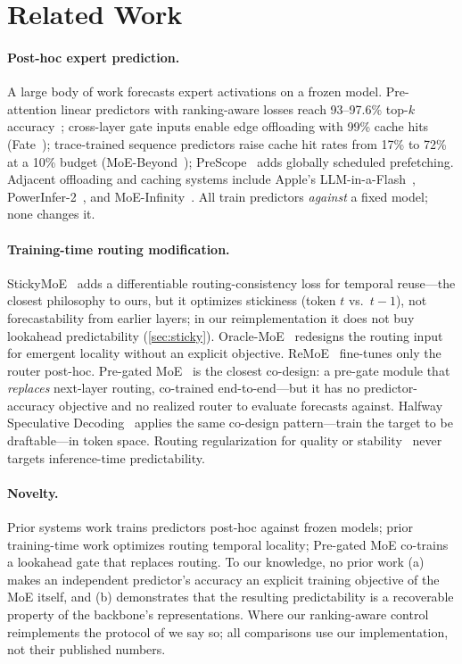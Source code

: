 \documentclass[10pt,letterpaper]{article}
\begin{document}
\section{Related Work}
\label{sec:related}

\paragraph{Post-hoc expert prediction.} A large body of work forecasts expert activations on a frozen model. Pre-attention linear predictors with ranking-aware losses reach 93--97.6\% top-$k$ accuracy~\citep{zhu2025preattention}; cross-layer gate inputs enable edge offloading with 99\% cache hits (Fate~\citep{fang2025fate}); trace-trained sequence predictors raise cache hit rates from 17\% to 72\% at a 10\% budget (MoE-Beyond~\citep{gavhane2025moebeyond}); PreScope~\citep{yu2025layerscope} adds globally scheduled prefetching. Adjacent offloading and caching systems include Apple's LLM-in-a-Flash~\citep{alizadeh2023llmflash}, PowerInfer-2~\citep{xue2024powerinfer2}, and MoE-Infinity~\citep{xue2024moeinfinity}. All train predictors \emph{against} a fixed model; none changes it.

\paragraph{Training-time routing modification.} StickyMoE~\citep{kayyam2026stickymoe} adds a differentiable routing-consistency loss for temporal reuse---the closest philosophy to ours, but it optimizes stickiness (token $t$ vs.\ $t{-}1$), not forecastability from earlier layers; in our reimplementation it does not buy lookahead predictability (\cref{sec:sticky}). Oracle-MoE~\citep{zhou2025oraclemoe} redesigns the routing input for emergent locality without an explicit objective. ReMoE~\citep{zhu2026remoe} fine-tunes only the router post-hoc. Pre-gated MoE~\citep{hwang2024pregated} is the closest co-design: a pre-gate module that \emph{replaces} next-layer routing, co-trained end-to-end---but it has no predictor-accuracy objective and no realized router to evaluate forecasts against. Halfway Speculative Decoding~\citep{nistor2026halfway} applies the same co-design pattern---train the target to be draftable---in token space. Routing regularization for quality or stability~\citep{dai2022stablemoe,lv2025coupling,hu2026synergistic} never targets inference-time predictability.

\paragraph{Novelty.} Prior systems work trains predictors post-hoc against frozen models; prior training-time work optimizes routing temporal locality; Pre-gated MoE co-trains a lookahead gate that replaces routing. To our knowledge, no prior work (a) makes an independent predictor's accuracy an explicit training objective of the MoE itself, and (b) demonstrates that the resulting predictability is a recoverable property of the backbone's representations. Where our ranking-aware control reimplements the protocol of \citet{zhu2025preattention} we say so; all comparisons use our implementation, not their published numbers.
\end{document}
